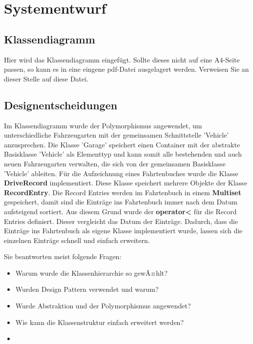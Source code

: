 \documentclass[12pt,naustrian,a4widepaper]{scrartcl}
\begin{document}
\clearpage
\section{Systementwurf}

\subsection{Klassendiagramm}
\color{blue}
Hier wird das Klassendiagramm eingefügt. Sollte dieses nicht auf eine A4-Seite passen, so kann es in eine eingene pdf-Datei ausgelagert werden.
Verweisen Sie an dieser Stelle auf diese Datei.
\color{black}


\subsection{Designentscheidungen}
Im Klassendiagramm wurde der Polymorphismus angewendet, um unterschiedliche Fahrzeugarten mit der gemeinsamen Schnittstelle 'Vehicle' anzusprechen. Die Klasse 'Garage' speichert einen Container mit der abstrakte Basisklasse 'Vehicle' als Elementtyp und kann somit alle bestehenden und auch neuen Fahrzeugarten verwalten, die sich von der gemeinsamen Basisklasse 'Vehicle' ableiten.
Für die Aufzeichnung eines Fahrtenbuches wurde die Klasse \textbf{DriveRecord} implementiert. Diese Klasse speichert mehrere Objekte der Klasse \textbf{RecordEntry}.
Die Record Entries werden im Fahrtenbuch in einem \textbf{Multiset} gespeichert, damit sind die Einträge ins Fahrtenbuch immer nach dem Datum aufsteigend sortiert.
Aus diesem Grund wurde der \textbf{operator<} für die Record Entries definiert. Dieser vergleicht das Datum der Einträge.
Dadurch, dass die Einträge ins Fahrtenbuch als eigene Klasse implementiert wurde, lassen sich die einzelnen Einträge schnell und einfach erweitern.

Sie beantworten meist folgende Fragen:\\
\begin{itemize}
	\item Warum wurde die Klassenhierarchie so gewÃ¤hlt?
	\item Wurden Design Pattern verwendet und warum?
	\item Wurde Abstraktion und der Polymorphismus angewendet?
	\item Wie kann die Klassenstruktur einfach erweitert werden?
	\item 
\end{itemize}

\color{black}
\end{document}
